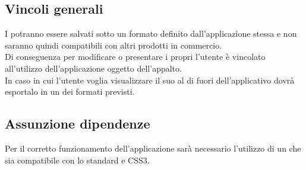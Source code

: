\subsection{Vincoli generali}
I  potranno essere salvati sotto un formato definito dall'applicazione stessa e non saranno quindi compatibili con altri prodotti in commercio.\\
Di conseguenza per modificare o presentare i propri  l'utente è vincolato all'utilizzo dell'applicazione oggetto dell'appalto.\\
In caso in cui l'utente voglia visualizzare il suo  al di fuori dell'applicativo dovrà esportalo in un dei formati previsti.
\subsection{Assunzione dipendenze}
Per il corretto funzionamento dell’applicazione sarà necessario l’utilizzo di un  che sia compatibile con lo standard  e CSS3.

